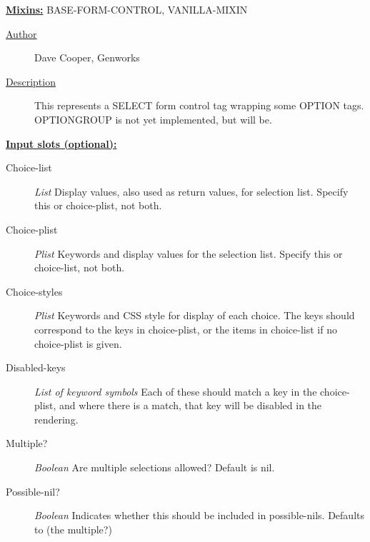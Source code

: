 \documentclass [11pt]{book}
\begin{document}
\begin{itemize}
\textbf{
\underline{Mixins:}} BASE-FORM-CONTROL, VANILLA-MIXIN





\begin{description}

\item [
\underline{Author}]


Dave Cooper, Genworks



\item [
\underline{Description}]


This represents a SELECT form control tag wrapping some OPTION tags.
OPTIONGROUP is not yet implemented, but will be.



\end{description}








\textbf{
\underline{Input slots (optional):}}

\begin{description}

\item [Choice-list]
\emph{List} Display values, also used as return values, for selection list. Specify this or choice-plist, not both.


\item [Choice-plist]
\emph{Plist} Keywords and display values for the selection list. Specify this or choice-list, not both.


\item [Choice-styles]
\emph{Plist} Keywords and CSS style for display of each choice. The keys should correspond to the
keys in choice-plist, or the items in choice-list if no choice-plist is given.


\item [Disabled-keys]
\emph{List of keyword symbols} Each of these should match a key in the choice-plist, and where there is a
match, that key will be disabled in the rendering.


\item [Multiple?]
\emph{Boolean} Are multiple selections allowed? Default is nil.


\item [Possible-nil?]
\emph{Boolean} Indicates whether this should be included in possible-nils. Defaults to (the multiple?)



\end{description}
\end{itemize}
\end{document}
